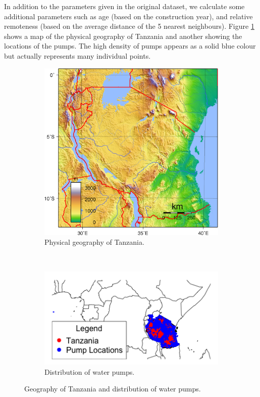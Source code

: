 \documentclass{article} %
\begin{document}
In addition to the parameters given in the original dataset, we calculate some additional parameters such as age (based on the construction year), and relative remoteness (based on the average distance of the 5 nearest neighbours). Figure \ref{fig:map-phys} shows a map of the physical geography of Tanzania and another showing the locations of the pumps. The high density of pumps appears as a solid blue colour but actually represents many individual points.

\begin{figure}
  \centering
  \begin{subfigure}[b]{0.5\textwidth}
    \centering
    \includegraphics[width=\textwidth]{figures/Tanzania}
    \caption{Physical geography of Tanzania.}
    \label{fig:map-phys}
  \end{subfigure}~\begin{subfigure}[b]{0.5\textwidth}
    \centering
    \includegraphics[width=\textwidth]{figures/PumpMap}
    \caption{Distribution of water pumps.}
    \label{fig:map-points}
  \end{subfigure}
  \caption{Geography of Tanzania and distribution of water pumps.}
  \label{fig:map}
\end{figure}
\end{document}
